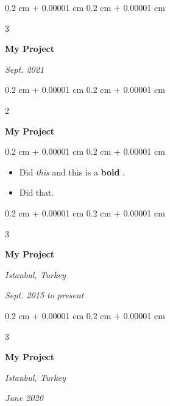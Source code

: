 \documentclass[10pt, letterpaper]{article}
\newenvironment{highlights}{
    \begin{itemize}[
        topsep=0.10 cm,
        parsep=0.10 cm,
        partopsep=0pt,
        itemsep=0pt,
        leftmargin=0.4 cm + 10pt + 0.6 cm
    ]
}{
    \end{itemize}
} %
\newenvironment{onecolentry}{
    \begin{adjustwidth}{
        0.2 cm + 0.00001 cm
    }{
        0.2 cm + 0.00001 cm
    }
}{
    \end{adjustwidth}
} %
\newenvironment{onecolentrybulleted}{
    \onecolentry
    \setcolumnwidth{0.6 cm, \fill}
    \begin{paracol}{2}
    \vspace*{\fill}
    \textbullet
    \vspace*{3px}
    \vspace*{\fill}
    \switchcolumn
}{
    \end{paracol}
    \endonecolentry
} %
\newenvironment{threecolentry}[3][]{
    \onecolentry
    \def\thirdColumn{#3}
    \setcolumnwidth{0.6 cm, \fill, 4.5 cm}
    \begin{paracol}{3}
    #2 \switchcolumn
}{
    \switchcolumn \raggedleft \thirdColumn
    \end{paracol}
    \endonecolentry
} %
\let\hrefWithoutArrow\href
\renewcommand{\href}[2]{\hrefWithoutArrow{#1}{\mbox{\ifthenelse{\equal{#2}{}}{ }{#2 }\raisebox{.15ex}{\footnotesize \faExternalLink*}}}}
\begin{document}
        \vspace{0.2 cm-3px}

        \begin{threecolentry}{
            \vspace*{\fill}
            \textbullet
            \vspace*{3px}
            \vspace*{\fill}
        }{
            
            
        \textit{Sept. 2021}}
            \textbf{My Project}
        \end{threecolentry}



        \vspace{0.2 cm-3px}

        \begin{onecolentrybulleted}
            \textbf{My Project}
        \end{onecolentrybulleted}

        \vspace{0.10 cm-3px}
        \begin{onecolentry}
            \begin{highlights}
                \item Did \textit{this} and this is a \textbf{bold} \href{https://example.com}{link}.
                \item Did that.
            \end{highlights}
        \end{onecolentry}


        \vspace{0.2 cm-3px}

        \begin{threecolentry}{
            \vspace*{\fill}
            \textbullet
            \vspace*{3px}
            \vspace*{\fill}
        }{
        \textit{Istanbul, Turkey}    
            
        \textit{Sept. 2015 to present}}
            \textbf{My Project}
        \end{threecolentry}



        \vspace{0.2 cm-3px}

        \begin{threecolentry}{
            \vspace*{\fill}
            \textbullet
            \vspace*{3px}
            \vspace*{\fill}
        }{
        \textit{Istanbul, Turkey}    
            
        \textit{June 2020}}
            \textbf{My Project}
        \end{threecolentry}
\end{document}
